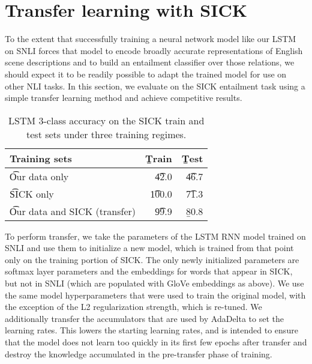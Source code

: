\section{Transfer learning with SICK}

To the extent that successfully training a neural network model like our LSTM on SNLI forces that model to encode broadly accurate representations of English scene descriptions and to build an entailment classifier over those relations, we should expect it to be readily possible to adapt the trained model for use on other NLI tasks. In this section, we evaluate on the SICK entailment task using a simple transfer learning method \cite{pratt1991direct} and achieve competitive results.

\begin{table}
\begin{center}
\begin{tabular}{l@{\hskip \colspaceL}@{\hskip \colspaceL}r@{\hskip \colspaceL}r}
\toprule
\textbf{Training sets} & \b{Train}  & \b{Test}\\
\midrule
\t{Our data only}            & \t{42.0} & \t{46.7} \\
\t{SICK only}            & \t{100.0} & \t{71.3} \\
\t{Our data and SICK (transfer)}            & \t{99.9} & \b{80.8} \\
\bottomrule
\end{tabular}
\end{center}

\caption{\label{tab:transferresults}
LSTM 3-class accuracy on the SICK train and test sets under three training regimes.} 
\end{table}


To perform transfer, we take the parameters of the LSTM RNN model trained on SNLI and use them to initialize a new model, which is trained from that point only on the training portion of SICK. The only newly initialized parameters are softmax layer parameters and the embeddings for words that appear in SICK, but not in SNLI (which are populated with GloVe embeddings as above). We use the same model hyperparameters that were used to train the original model, with the exception of the L2 regularization strength, which is re-tuned. We additionally transfer the accumulators that are used by AdaDelta to set the learning rates. This lowers the starting learning rates, and is intended to ensure that the model does not learn too quickly in its first few epochs after transfer and destroy the knowledge accumulated in the pre-transfer phase of training.

